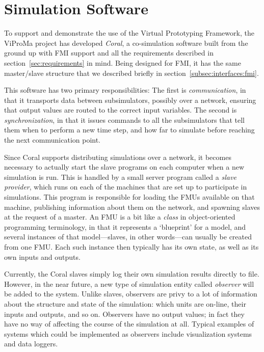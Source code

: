 \documentclass[prb,aps,showpacs,floatfix,twocolumn,10pt]{revtex4-1}
\newcommand{\cosimSW}{Coral}
\newcommand{\sub}{subsimulator}
\theoremstyle{plain}
\theoremstyle{remark}
\begin{document}

\section{Simulation Software}
\label{sec:software}

To support and demonstrate the use of the Virtual Prototyping Framework, the ViProMa project has developed \emph{\cosimSW{}}, a co-simulation software built from the ground up with FMI support and all the requirements described in section~\ref{sec:requirements} in mind.
Being designed for FMI, it has the same master/slave structure that we described briefly in section~\ref{subsec:interfaces:fmi}.

This software has two primary responsibilities:
The first is \emph{communication}, in that it transports data between \sub{}s, possibly over a network, ensuring that output values are routed to the correct input variables.
The second is \emph{synchronization}, in that it issues commands to all the \sub{}s that tell them when to perform a new time step, and how far to simulate before reaching the next communication point.

Since \cosimSW{} supports distributing simulations over a network, it becomes necessary to actually start the slave programs on each computer when a new simulation is run.
This is handled by a small server program called a \emph{slave provider}, which runs on each of the machines that are set up to participate in simulations.
This program is responsible for loading the FMUs available on that machine, publishing information about them on the network, and spawning slaves at the request of a master.
An FMU is a bit like a \emph{class} in object-oriented programming terminology, in that it represents a `blueprint' for a model, and several instances of that model---slaves, in other words---can usually be created from one FMU.
Each such instance then typically has its own state, as well as its own inputs and outputs.

Currently, the \cosimSW{} slaves simply log their own simulation results directly to file.
However, in the near future, a new type of simulation entity called \emph{observer} will be added to the system.
Unlike slaves, observers are privy to a lot of information about the structure and state of the simulation: which units are on-line, their inputs and outputs, and so on.
Observers have no output values; in fact they have no way of affecting the course of the simulation at all.
Typical examples of systems which could be implemented as observers include visualization systems and data loggers.
\end{document}
